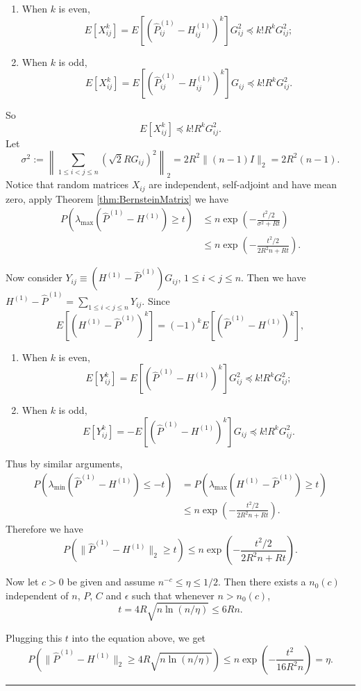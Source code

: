 \documentclass[a4paper]{article}
\newenvironment{proof}{{\bf Proof:  }}{\hfill\rule{2mm}{2mm}}
\begin{document}
\begin{proof}
\begin{enumerate}
\item When $k$ is even,
\[
E[X_{ij}^k] = E[(\hat{P}^{(1)}_{ij} - H^{(1)}_{ij})^k] G_{ij}^2 \preceq k! R^k G_{ij}^2;
\]
\item When $k$ is odd,
\[
E[X_{ij}^k] = E[(\hat{P}^{(1)}_{ij} - H^{(1)}_{ij})^k] G_{ij} \preceq k! R^k G_{ij}^2.
\]
\end{enumerate}
So
\[
E[X_{ij}^k] \preceq k! R^k G_{ij}^2.
\]
Let
\[
	\sigma^2 := \left\| \sum_{1 \le i < j \le n} (\sqrt{2} R G_{ij})^2 \right\|_2 = 2 R^2 \| (n - 1) I \|_2 = 2 R^2 (n - 1).
\]
Notice that random matrices $X_{ij}$ are independent, self-adjoint and have mean zero, apply Theorem \ref{thm:BernsteinMatrix} we have
\begin{align*}
	P \left( \lambda_{\max}(\hat{P}^{(1)} - H^{(1)}) \ge t \right) &
    \le n \exp \left( - \frac{t^2/2}{\sigma^2 + R t} \right) \\
    & \le n \exp \left( - \frac{t^2/2}{2 R^2 n + R t} \right).
\end{align*}

Now consider $Y_{ij} \equiv \left( H^{(1)} - \hat{P}^{(1)} \right) G_{ij}$, $1 \le i < j \le n$. Then we have $H^{(1)} - \hat{P}^{(1)} = \sum_{1 \le i < j \le n} Y_{ij}$.
Since
\[
	E[(H^{(1)} - \hat{P}^{(1)})^k]
    = (-1)^k E[(\hat{P}^{(1)} - H^{(1)})^k],
\]
\begin{enumerate}
\item When $k$ is even,
\[
E[Y_{ij}^k] = E[(\hat{P}^{(1)} - H^{(1)})^k] G_{ij}^2 \preceq k! R^k G_{ij}^2;
\]
\item When $k$ is odd,
\[
E[Y_{ij}^k] = - E[(\hat{P}^{(1)} - H^{(1)})^k] G_{ij} \preceq k! R^k G_{ij}^2.
\]
\end{enumerate}
Thus by similar arguments,
\begin{align*}
	P \left( \lambda_{\min}(\hat{P}^{(1)} - H^{(1)}) \le -t \right) &
    = P \left( \lambda_{\max}(H^{(1)} - \hat{P}^{(1)}) \ge t \right) \\
    & \le n \exp \left( - \frac{t^2/2}{2 R^2 n + R t} \right).
\end{align*}
Therefore we have
\[
	P \left( \| \hat{P}^{(1)} - H^{(1)} \|_2 \ge t \right)
    \le n \exp \left( - \frac{t^2/2}{2 R^2 n + R t} \right).
\]

Now let $c > 0$ be given and assume $n^{-c} \le \eta \le 1/2$. Then there exists a $n_0(c)$ independent of $n$, $P$, $C$ and $\epsilon$ such that whenever $n > n_0(c)$,
\[
	t =  4 R \sqrt{n \ln(n/\eta)} \le 6 R n.
\]

Plugging this $t$ into the equation above, we get
\[
	P(\| \hat{P}^{(1)} - H^{(1)} \|_2 \ge 4 R \sqrt{n \ln(n/\eta)})
    \le n \exp\left(-\frac{t^2}{16 R^2 n}\right) = \eta.
\]
\end{proof}
\end{document}
